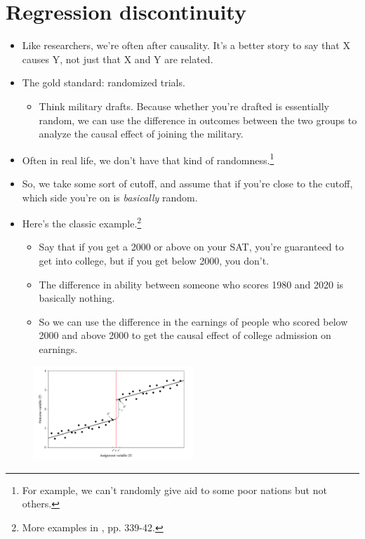 \documentclass{beamer}
\begin{document}
\section{Regression discontinuity}

\begin{frame}
	\begin{itemize}
	\item Like researchers, we're often after causality. It's a better story to say that X causes Y, not just that X and Y are related.
	\item The gold standard: randomized trials. 
		\begin{itemize}
			\item Think military drafts. Because whether you're drafted is essentially random, we can use the difference in outcomes between the two groups to analyze the causal effect of joining the military.
		\end{itemize}
	\item Often in real life, we don't have that kind of randomness.\footnote{For example, we can't randomly give aid to some poor nations but not others.}
	\item So, we take some sort of cutoff, and assume that if you're close to the cutoff, which side you're on is \textit{basically} random.
	\end{itemize}
\end{frame}

\begin{frame}
	\begin{itemize}
		\item Here's the classic example.\footnote{More examples in \cite{lee2010regression}, pp. 339-42.}
		\begin{itemize}
			\item Say that if you get a 2000 or above on your SAT, you're guaranteed to get into college, but if you get below 2000, you don't.
			\item The difference in ability between someone who scores 1980 and 2020 is basically nothing.
			\item So we can use the difference in the earnings of people who scored below 2000 and above 2000 to get the causal effect of college admission on earnings.
		\end{itemize}
	\end{itemize}
	\begin{figure}
		\includegraphics[width=6cm]{lee-rd.png}
		\centering
	\end{figure}
\end{frame}
\end{document}

